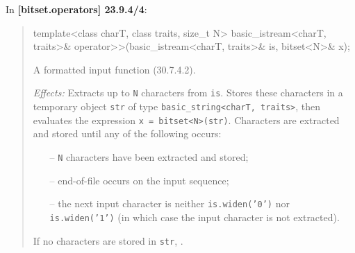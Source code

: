 \documentclass{wg21}
\begin{document}
In \textbf{[bitset.operators] 23.9.4/4}:
\begin{quote}
\begin{codeblock}
template<class charT, class traits, size_t N>
  basic_istream<charT, traits>&
    operator>>(basic_istream<charT, traits>& is, bitset<N>& x);
\end{codeblock}
A formatted input function (30.7.4.2).

\textit{Effects:} Extracts up to \texttt{N} characters from \texttt{is}. Stores
these characters in a temporary object \texttt{str} of type \texttt{basic_string<charT, traits>},
then evaluates the expression \texttt{x = bitset<N>(str)}. Characters are
extracted and stored until any of the following occurs:
\begin{itemize}
  \item[--] \texttt{N} characters have been extracted and stored;
  \item[--] end-of-file occurs on the input sequence;
  \item[--] the next input character is neither \texttt{is.widen(’0’)} nor
            \texttt{is.widen(’1’)} (in which case the input character is not extracted).
\end{itemize}
If no characters are stored in \texttt{str}, .
\end{quote}
\end{document}
